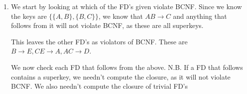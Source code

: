 \documentclass[12pt,letterpaper]{article}
\newcommand{\closure}[1]{\{#1\}^+}
\begin{document}
\begin{enumerate}
\begin{enumerate}
\begin{proof}
\begin{itemize}
                So, we cannot simplify the left sides of any of our FD's.

              \item
                We check to see if we can remove any FD's from the set by computing the closure of the left with the rest of the set.

                \begin{itemize}
                  \item $AB \rightarrow C$
                    \[\closure{A, B} = \{A, B, E\}\]

                    Since this did not close over $C$, we cannot remove this FD.
                  \item $B \rightarrow E$
                    \[\closure{B} = \{B\}\]

                    Since this did not close over $E$, we cannot remove this FD.
                  \item $CE \rightarrow A$
                    \[\closure{C, E} = \{C, E\}\]

                    Since this did not close over $A$, we cannot remove this FD.
                  \item $AC \rightarrow D$
                    \[\closure{A, C} = \{A, C\}\]

                    Since this did not close over $D$, we cannot remove this FD.
                \end{itemize}

                So, we cannot remove any FD's from the set.
            \end{itemize}

            Since we already have every right side being singleton,
            we cannot simplify the left sides of any of the FD's,
            and we cannot remove any FD's,
            this is a minimal basis.
          \end{proof}
        \item
          We start by looking at which of the FD's given violate BCNF.
          Since we know the keys are $\{\{A,B\}, \{B,C\}\}$,
          we know that $AB \rightarrow C$ and anything that follows from it will not violate BCNF,
          as these are all superkeys.

          This leaves the other FD's as violators of BCNF.
          These are $B \rightarrow E, CE \rightarrow A, AC \rightarrow D$.

          We now check each FD that follows from the above.
          N.B. If a FD that follows contains a superkey,
          we needn't compute the closure, as it will not violate BCNF.
          We also needn't compute the closure of trivial FD's


\end{enumerate}
\end{enumerate}
\end{document}
